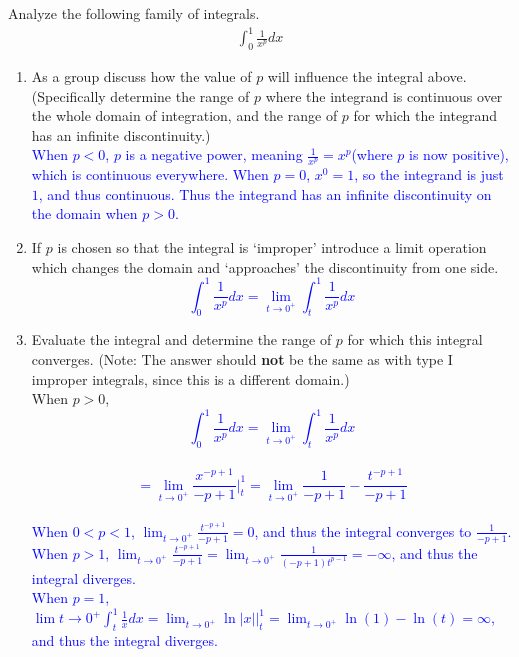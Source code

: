 \documentclass{ximera}
\begin{document}
\begin{exercise}
Analyze the following family of integrals.
\begin{align}
	\int_{0}^1 \frac{1}{x^p} dx \nonumber
\end{align}
\begin{enumerate}
\item As a group discuss how the value of $p$ will influence the integral above. (Specifically determine the range of $p$ where the integrand is continuous over the whole domain of integration, and the range of $p$ for which the integrand has an infinite discontinuity.)\\
    \textcolor{blue}{When $p<0$, $p$ is a negative power, meaning $\frac{1}{x^p}=x^p$(where $p$ is now positive), which is continuous everywhere.  When $p=0$, $x^{0}=1$, so the integrand is just $1$, and thus continuous.  Thus the integrand has an infinite discontinuity on the domain when $p>0$.}

\item If $p$ is chosen so that the integral is `improper' introduce a limit operation which changes the domain and `approaches' the discontinuity from one side.\\
    \textcolor{blue}{$$\int_0^1\frac{1}{x^p}dx=\lim_{t\to 0^+}\int_t^1\frac{1}{x^p}dx$$}
\item Evaluate the integral and determine the range of $p$ for which this integral converges. (Note: The answer should {\bf{not}} be the same as with type I improper integrals, since this is a different domain.)\\When $p>0$,\\
    \textcolor{blue}{$$\int_0^1\frac{1}{x^p}dx=\lim_{t\to 0^+}\int_t^1\frac{1}{x^p}dx$$\\
$$=\lim_{t\rightarrow 0^+}\frac{x^{-p+1}}{-p+1}\bigg|_t^1=\lim_{t\rightarrow 0^+}\frac{1}{-p+1}-\frac{t^{-p+1}}{-p+1}$$\\
When $0<p<1$, $\lim_{t\rightarrow 0^+}\frac{t^{-p+1}}{-p+1}=0$, and thus the integral converges to $\frac{1}{-p+1}$. \\
When $p>1$, $\lim_{t\rightarrow 0^+}\frac{t^{-p+1}}{-p+1}=\lim_{t\rightarrow 0^+}\frac{1}{(-p+1)t^{p-1}}=-\infty$, and thus the integral diverges.\\
When $p=1$, $\lim{t\rightarrow 0^+}\int_t^1 \frac1{x}dx=\lim_{t\rightarrow 0^+}\ln|x|\bigg|_t^1=\lim_{t\rightarrow 0^+}\ln(1)-\ln(t)=\infty$, and thus the integral diverges.}
\end{enumerate}
\end{exercise}
\end{document}
